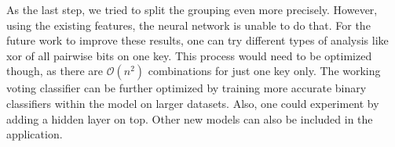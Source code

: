As the last step, we tried to split the grouping even more precisely. However, using the existing features, the neural network is unable to do that. For the future work to improve these results, one can try different types of analysis like xor of all pairwise bits on one key. This process would need to be optimized though, as there are $\mathcal{O}(n^2)$ combinations for just one key only. The working voting classifier can be further optimized by training more accurate binary classifiers within the model on larger datasets. Also, one could experiment by adding a hidden layer on top. Other new models can also be included in the application.
